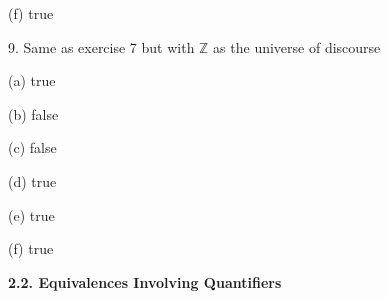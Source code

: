 \documentclass{article}
\begin{document}
(f) true

\vspace{30pt}

9. Same as exercise 7 but with $\mathbb{Z}$ as the universe of discourse
\vspace{30pt}

(a) true

\vspace{20pt}

(b) false

\vspace{20pt}

(c) false

\vspace{20pt}

(d) true

\vspace{20pt}

(e) true

\vspace{20pt}

(f) true

\vspace{30pt}

\textbf{2.2. Equivalences Involving Quantifiers}
\end{document}
